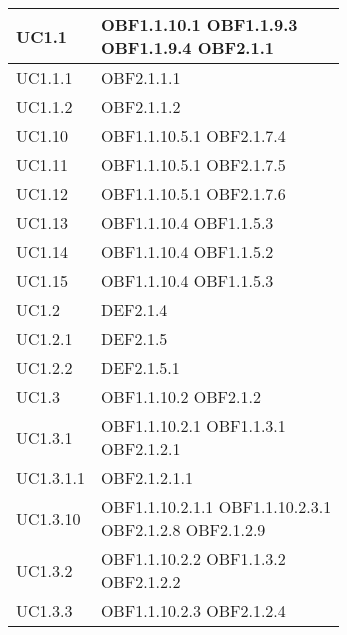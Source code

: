 \documentclass{scalatekids-article}
\begin{document}
\begin{longtable}[H]{|p{5.5cm}|p{5.5cm}|}
  \hline
  UC1.1 & \multiLineCell[t]{OBF1.1.10.1 OBF1.1.9.3\\OBF1.1.9.4 OBF2.1.1\\}\\
  \hline
  UC1.1.1 & \multiLineCell[t]{OBF2.1.1.1\\}\\
  \hline
  UC1.1.2 & \multiLineCell[t]{OBF2.1.1.2\\}\\
  \hline
  UC1.10 & \multiLineCell[t]{OBF1.1.10.5.1 OBF2.1.7.4\\}\\
  \hline
  UC1.11 & \multiLineCell[t]{OBF1.1.10.5.1 OBF2.1.7.5\\}\\
  \hline
  UC1.12 & \multiLineCell[t]{OBF1.1.10.5.1 OBF2.1.7.6\\}\\
  \hline
  UC1.13 & \multiLineCell[t]{OBF1.1.10.4 OBF1.1.5.3\\}\\
  \hline
  UC1.14 & \multiLineCell[t]{OBF1.1.10.4 OBF1.1.5.2\\}\\
  \hline
  UC1.15 & \multiLineCell[t]{OBF1.1.10.4 OBF1.1.5.3\\}\\
  \hline
  UC1.2 & \multiLineCell[t]{DEF2.1.4\\}\\
  \hline
  UC1.2.1 & \multiLineCell[t]{DEF2.1.5\\}\\
  \hline
  UC1.2.2 & \multiLineCell[t]{DEF2.1.5.1\\}\\
  \hline
  UC1.3 & \multiLineCell[t]{OBF1.1.10.2 OBF2.1.2\\}\\
  \hline
  UC1.3.1 & \multiLineCell[t]{OBF1.1.10.2.1 OBF1.1.3.1\\OBF2.1.2.1}\\
  \hline
  UC1.3.1.1 & \multiLineCell[t]{OBF2.1.2.1.1\\}\\
  \hline
  UC1.3.10 & \multiLineCell[t]{OBF1.1.10.2.1.1 OBF1.1.10.2.3.1\\OBF2.1.2.8 OBF2.1.2.9\\}\\
  \hline
  UC1.3.2 & \multiLineCell[t]{OBF1.1.10.2.2 OBF1.1.3.2\\OBF2.1.2.2}\\
  \hline
  UC1.3.3 & \multiLineCell[t]{OBF1.1.10.2.3 OBF2.1.2.4\\}\\

\end{longtable}
\end{document}
